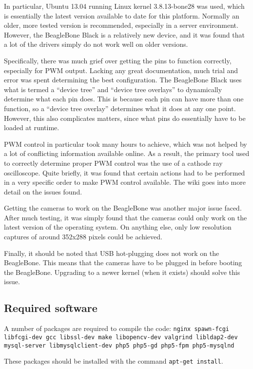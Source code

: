 In particular, Ubuntu 13.04 running Linux kernel 3.8.13-bone28 was used, which is essentially the latest version available to date for this platform. Normally an older, more tested version is recommended, especially in a server environment. However, the BeagleBone Black is a relatively new device, and it was found that a lot of the drivers simply do not work well on older versions.

Specifically, there was much grief over getting the pins to function correctly, especially for PWM output. Lacking any great documentation, much trial and error was spent determining the best configuration. The BeagleBone Black uses what is termed a ``device tree'' \cite{beaglebone3.8, devicetreetutorial} and ``device tree overlays'' to dynamically determine what each pin does. This is because each pin can have more than one function, so a ``device tree overlay'' determines what it does at any one point. However, this also complicates matters, since what pins do essentially have to be loaded at runtime. 

PWM control in particular took many hours to achieve, which was not helped by a lot of conflicting information available online. As a result, the primary tool used to correctly determine proper PWM control was the use of a cathode ray oscilloscope. Quite briefly, it was found that certain actions had to be performed in a very specific order to make PWM control available. The wiki goes into more detail on the issues found.

Getting the cameras to work on the BeagleBone was another major issue faced. After much testing, it was simply found that the cameras could only work on the latest version of the operating system. On anything else, only low resolution captures of around 352x288 pixels could be achieved.

Finally, it should be noted that USB hot-plugging does not work on the BeagleBone. This means that the cameras have to be plugged in before booting the BeagleBone. Upgrading to a newer kernel (when it exists) should solve this issue.


\subsection{Required software}
A number of packages are required to compile the code:
\texttt{nginx spawn-fcgi libfcgi-dev gcc libssl-dev make libopencv-dev valgrind libldap2-dev mysql-server libmysqlclient-dev php5 php5-gd php5-fpm php5-mysqlnd}

These packages should be installed with the command \texttt{apt-get install}.


